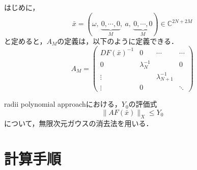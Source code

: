 \begin{dfn}
  \label{dfn:作用素A}
  はじめに，
  \begin{equation}
    \bar{x} = (\omega,\ \underbrace{0,\cdots,0}_{M},\ a,\ \underbrace{0,\cdots,0}_{M}) \in \mathbb{C}^{2N+2M}
  \end{equation}
  と定めると，$A_M$の定義は，以下のように定義できる．
  \begin{equation*}
    A_M = \left(
    \begin{array}{c|ccc}
      DF(\bar{x})^{-1} & 0 & \cdots & \cdots \\ \hline
      0 & \lambda_N^{-1} &  & 0 \\
      \vdots &  & \lambda_{N+1}^{-1} &  \\
      \vdots & 0 &   & \ddots
    \end{array}
    \right)
  \end{equation*}
\end{dfn}




radii polynomial approachにおける，$Y_0$の評価式
\begin{equation}
  \label{eq:y0}
  \|AF(\bar{x})\|_X \leq Y_0
\end{equation}
について，無限次元ガウスの消去法を用いる．

\section{計算手順}

